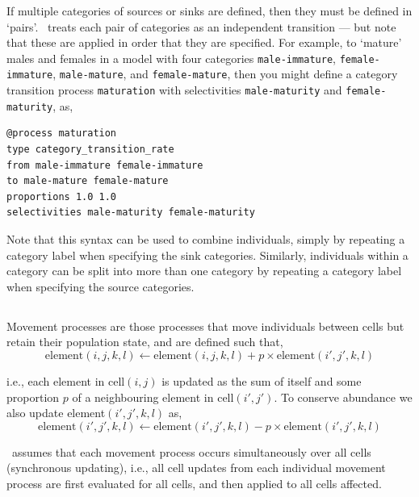 If multiple categories of sources or sinks are defined, then they must be defined in `pairs'. \SPM\ treats each pair of categories as an independent transition --- but note that these are applied in order that they are specified. For example, to `mature' males and females in a model with four categories \texttt{male-immature}, \texttt{female-immature}, \texttt{male-mature}, and \texttt{female-mature}, then you might define a category transition process \texttt{maturation} with selectivities \texttt{male-maturity} and \texttt{female-maturity}, as,

\begin{verbatim}
@process maturation
type category_transition_rate
from male-immature female-immature
to male-mature female-mature
proportions 1.0 1.0
selectivities male-maturity female-maturity
\end{verbatim}

Note that this syntax can be used to combine individuals, simply by repeating a category label when specifying the sink categories. Similarly, individuals within a category can be split into more than one category by repeating a category label when specifying the source categories.

\subsection{}

Movement processes are those processes that move individuals between cells but retain their population state, and are defined such that,
\begin{equation}
\text{element}(i,j,k,l)\leftarrow \text{element}(i,j,k,l) + p \times \text{element}(i',j',k,l)
\end{equation}

i.e., each element in cell$(i,j)$ is updated as the sum of itself and some proportion $p$ of a neighbouring element in cell$(i',j')$. To conserve abundance we also update element$(i',j',k,l)$ as,
\begin{equation}
\text{element}(i',j',k,l)\leftarrow \text{element}(i',j',k,l) - p\times \text{element}(i',j',k,l)
\end{equation}

\SPM\ assumes that each movement process occurs simultaneously over all cells (synchronous updating), i.e., all cell updates from each individual movement process are first evaluated for all cells, and then applied to all cells affected. 

